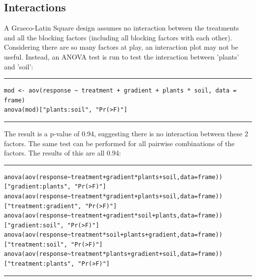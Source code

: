\documentclass{article}
\begin{document}
\subsection{Interactions}
A Graeco-Latin Square design assumes no interaction between the treatments and all the blocking factors (including all blocking factors with each other). Considering there are so many factors at play, an interaction plot may not be useful. Instead, an ANOVA test is run to test the interaction between 'plants' and 'soil':
\par\noindent\rule{\textwidth}{0.4pt}
\vspace{-25pt} %
\begin{verbatim}
mod <- aov(response ~ treatment + gradient + plants * soil, data = frame)
anova(mod)["plants:soil", "Pr(>F)"]
\end{verbatim}
\vspace{-15pt} %
\par\noindent\rule{\textwidth}{0.4pt}
The result is a p-value of 0.94, suggesting there is no interaction between these 2 factors. The same test can be performed for all pairwise combinations of the factors. The results of this are all 0.94:
\par\noindent\rule{\textwidth}{0.4pt}
\vspace{-25pt} %
\begin{verbatim}
anova(aov(response~treatment+gradient*plants+soil,data=frame))["gradient:plants", "Pr(>F)"]
anova(aov(response~treatment*gradient+plants+soil,data=frame))["treatment:gradient", "Pr(>F)"]
anova(aov(response~treatment+gradient*soil+plants,data=frame))["gradient:soil", "Pr(>F)"]
anova(aov(response~treatment*soil+plants+gradient,data=frame))["treatment:soil", "Pr(>F)"]
anova(aov(response~treatment*plants+gradient+soil,data=frame))["treatment:plants", "Pr(>F)"]
\end{verbatim}
\vspace{-15pt} %
\par\noindent\rule{\textwidth}{0.4pt}
\end{document}

